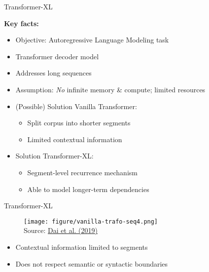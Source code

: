 
\begin{vbframe}{Transformer-XL}

\vfill

\textbf{Key facts:}

\begin{itemize}
	\item Objective: Autoregressive Language Modeling task
	\item Transformer decoder model
	\item Addresses long sequences
	\item Assumption: \textit{No} infinite memory \& compute; limited resources
	\item (Possible) Solution Vanilla Transformer:
		\begin{itemize}
			\item Split corpus into shorter segments
			\item Limited contextual information
		\end{itemize}
	\item Solution Transformer-XL:
		\begin{itemize}
			\item Segment-level recurrence mechanism
			\item Able to model longer-term dependencies
		\end{itemize}
\end{itemize}

\vfill

\end{vbframe}


\begin{vbframe}{Transformer-XL}

\begin{figure}
\centering
\texttt{[image: figure/vanilla-trafo-seq4.png]}\\ 
\footnotesize{Source:} \href{https://aclanthology.org/P19-1285.pdf}{\footnotesize Dai et al. (2019)}
\end{figure}

\begin{itemize}
		\item Contextual information limited to segments
		\item Does not respect semantic or syntactic boundaries
\end{itemize}

\end{vbframe}

